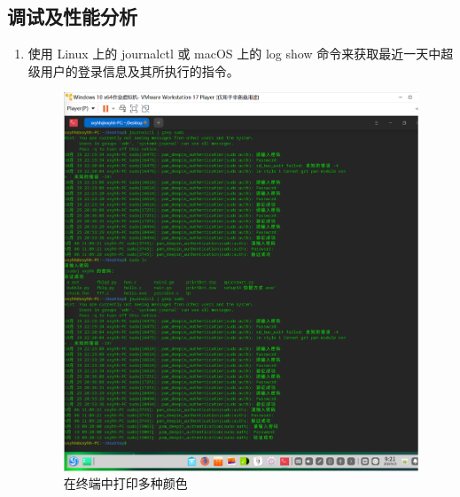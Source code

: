 \documentclass{ctexart}
\begin{document}
\subsection{调试及性能分析}
\begin{enumerate}
    \item 使用 Linux 上的 journalctl 或 macOS 上的 log show 命令来获取最近一天中超级用户的登录信息及其所执行的指令。
    \begin{figure}[H]
        \centering
        \includegraphics[width=12cm]{8bb31c175076ac6358f1ea10075020ac.png}
        \caption{在终端中打印多种颜色}
        \label{fig:4}
        \end{figure}


\end{enumerate}
\end{document}
